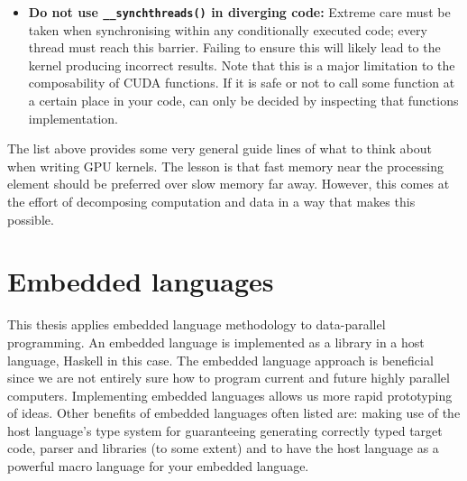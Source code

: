 \documentclass[a4paper]{book}
\begin{document}
\begin{itemize}
\item {\bf Do not use {\tt \_\_synchthreads()} in diverging code:} Extreme care must be taken 
when synchronising within any conditionally executed code; every thread must reach this barrier.
Failing to ensure this will likely lead to the kernel producing incorrect results. Note that 
this is a major limitation to the composability of CUDA functions. If it is safe or 
not to call some function at a certain place in your code, can only be decided by inspecting 
that functions implementation. 
\end{itemize} 

The list above provides some very general guide lines of what to think about when 
writing GPU kernels. The lesson is that fast memory near the processing element 
should be preferred over slow memory far away. However, this comes at the effort 
of decomposing computation and data in a way that makes this possible. 
 



%
%
\section{Embedded languages}

This thesis applies embedded language methodology to data-parallel programming. An 
embedded language is implemented as a library in a host language, Haskell in this case. 
The embedded language approach is beneficial since we are not entirely sure how 
to program current and future highly parallel computers. Implementing embedded languages allows 
us more rapid prototyping of ideas. Other benefits of embedded languages often listed 
are: making use of the host language's type system for guaranteeing generating correctly typed 
target code, parser and libraries (to some extent) 
and to have the host language as a powerful macro language for your embedded language. 
\end{document}
